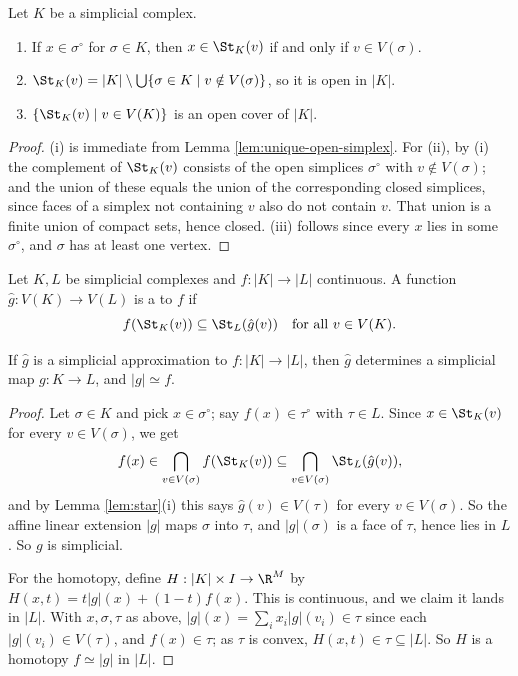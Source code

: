 \begin{lemma} \label{lem:star}
	Let $K$ be a simplicial complex.
	\begin{enumerate}
		\item If $x \in \sigma^\circ$ for $\sigma \in K$, then $x \in \St_K(v)$ if and only if $v \in V(\sigma)$.
		\item $\St_K(v) = |K| \setminus \bigcup\{\sigma \in K \mid v \notin V(\sigma)\}$, so it is open in $|K|$.
		\item $\{\St_K(v) \mid v \in V(K)\}$ is an open cover of $|K|$.
	\end{enumerate}
\end{lemma}
\begin{proof}
	(i) is immediate from Lemma \ref{lem:unique-open-simplex}. For (ii), by (i) the complement of $\St_K(v)$ consists of the open simplices $\sigma^\circ$ with $v \notin V(\sigma)$; and the union of these equals the union of the corresponding closed simplices, since faces of a simplex not containing $v$ also do not contain $v$. That union is a finite union of compact sets, hence closed. (iii) follows since every $x$ lies in some $\sigma^\circ$, and $\sigma$ has at least one vertex.
\end{proof}

\begin{definition}
	Let $K, L$ be simplicial complexes and $f: |K| \to |L|$ continuous. A function $\hat g: V(K) \to V(L)$ is a  to $f$ if
	$$
	f(\St_K(v)) \subseteq \St_L(\hat g(v)) \quad\text{for all } v \in V(K).
	$$
\end{definition}

\begin{theorem} \label{thm:approx-is-simplicial}
	If $\hat g$ is a simplicial approximation to $f: |K|\to|L|$, then $\hat g$ determines a simplicial map $g: K \to L$, and $|g| \simeq f$.
\end{theorem}
\begin{proof}
	Let $\sigma \in K$ and pick $x \in \sigma^\circ$; say $f(x) \in \tau^\circ$ with $\tau \in L$. Since $x \in \St_K(v)$ for every $v \in V(\sigma)$, we get
	$$
	f(x) \in \bigcap_{v \in V(\sigma)} f(\St_K(v)) \subseteq \bigcap_{v\in V(\sigma)}\St_L(\hat g(v)),
	$$
	and by Lemma \ref{lem:star}(i) this says $\hat g(v) \in V(\tau)$ for every $v \in V(\sigma)$. So the affine linear extension $|g|$ maps $\sigma$ into $\tau$, and $|g|(\sigma)$ is a face of $\tau$, hence lies in $L$. So $g$ is simplicial.

	For the homotopy, define $H: |K|\times I \to \R^M$ by $H(x,t) = t|g|(x) + (1-t)f(x)$. This is continuous, and we claim it lands in $|L|$. With $x, \sigma, \tau$ as above, $|g|(x) = \sum_i x_i|g|(v_i) \in \tau$ since each $|g|(v_i) \in V(\tau)$, and $f(x) \in \tau$; as $\tau$ is convex, $H(x,t)\in\tau \subseteq |L|$. So $H$ is a homotopy $f \simeq |g|$ in $|L|$.
\end{proof}

